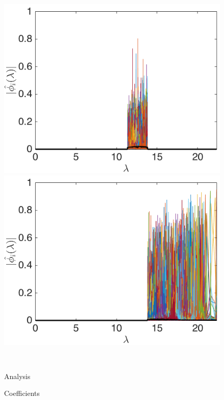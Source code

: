 \documentclass[journal, 10pt]{IEEEtran}
\begin{document}
\begin{figure}[bth]
\begin{minipage}[m]{0.16\linewidth}
\end{minipage}
\begin{minipage}[m]{0.16\linewidth}
\centerline{\includegraphics[width=.8\linewidth]{fig_bunny_freq_wav3a}}
\end{minipage}
\begin{minipage}[m]{0.16\linewidth}
\centerline{\includegraphics[width=.8\linewidth]{fig_bunny_freq_wav4a}}
\end{minipage}\\
\begin{minipage}[m]{0.16\linewidth}
\centerline{\small{Analysis}}
\centerline{\small{Coefficients}}
\end{minipage}
\begin{minipage}[m]{0.16\linewidth}

\end{minipage}
\end{figure}
\end{document}
